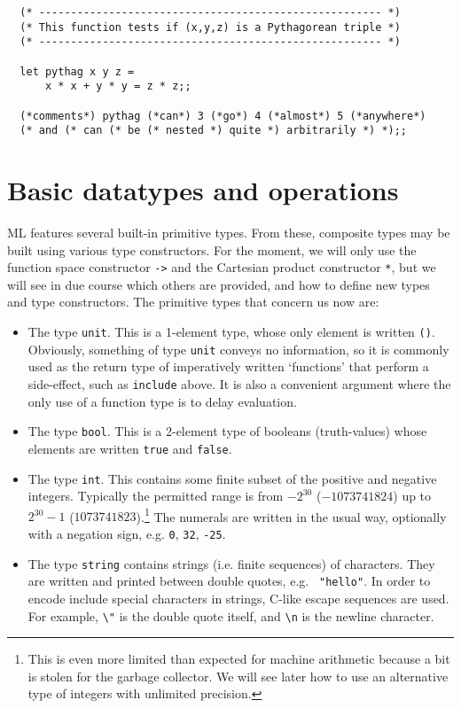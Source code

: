 \begin{boxed}\begin{verbatim}
  (* ------------------------------------------------------ *)
  (* This function tests if (x,y,z) is a Pythagorean triple *)
  (* ------------------------------------------------------ *)

  let pythag x y z =
      x * x + y * y = z * z;;

  (*comments*) pythag (*can*) 3 (*go*) 4 (*almost*) 5 (*anywhere*)
  (* and (* can (* be (* nested *) quite *) arbitrarily *) *);;
\end{verbatim}\end{boxed}

\section{Basic datatypes and operations}

ML features several built-in primitive types. From these, composite types may
be built using various type constructors. For the moment, we will only use the
function space constructor {\verb+->+} and the Cartesian product constructor
{\verb+*+}, but we will see in due course which others are provided, and how to
define new types and type constructors. The primitive types that concern us now
are:

\begin{itemize}

\item The type {\tt unit}. This is a 1-element type, whose only element is
written {\tt ()}. Obviously, something of type {\tt unit} conveys no
information, so it is commonly used as the return type of imperatively written
`functions' that perform a side-effect, such as {\tt include} above. It is also
a convenient argument where the only use of a function type is to delay
evaluation.

\item The type {\tt bool}. This is a 2-element type of booleans (truth-values)
whose elements are written {\tt true} and {\tt false}.

\item The type {\tt int}. This contains some finite subset of the positive and
negative integers. Typically the permitted range is from $-2^{30}$
($-1073741824$) up to $2^{30}-1$ ($1073741823$).\footnote{This is even more
limited than expected for machine arithmetic because a bit is stolen for the
garbage collector. We will see later how to use an alternative type of integers
with unlimited precision.} The numerals are written in the usual way,
optionally with a negation sign, e.g. {\tt 0}, {\tt 32}, {\tt -25}.

\item The type {\tt string} contains strings (i.e. finite sequences) of
characters. They are written and printed between double quotes, e.g. {\tt
"hello"}. In order to encode include special characters in strings, C-like
escape sequences are used. For example, {\verb+\"+} is the double quote itself,
and {\verb+\n+} is the newline character.

\end{itemize}

